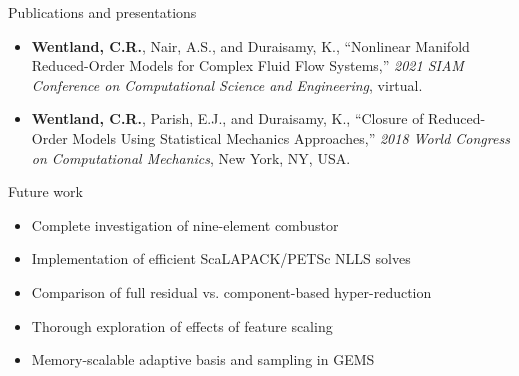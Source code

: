 \documentclass[]{beamer}
\begin{document}
\begin{frame}{Publications and presentations}
\begin{itemize}
\begin{itemize}
			\item \textbf{Wentland, C.R.}, Nair, A.S., and Duraisamy, K., ``Nonlinear Manifold Reduced-Order Models for Complex Fluid Flow Systems,'' \textit{2021 SIAM Conference on Computational Science and Engineering}, virtual.
			\item \tiny \textbf{Wentland, C.R.}, Parish, E.J., and Duraisamy, K., ``Closure of Reduced-Order Models Using Statistical Mechanics Approaches,'' \textit{2018 World Congress on Computational Mechanics}, New York, NY, USA.
		\end{itemize}
	\end{itemize}
	
\end{frame}

\begin{frame}{Future work}
	\begin{itemize}
		\item Complete investigation of nine-element combustor
		\item Implementation of efficient ScaLAPACK/PETSc NLLS solves
		\item Comparison of full residual vs. component-based hyper-reduction
		\item Thorough exploration of effects of feature scaling
		\item Memory-scalable adaptive basis and sampling in GEMS
	\end{itemize}
\end{frame}
\end{document}
